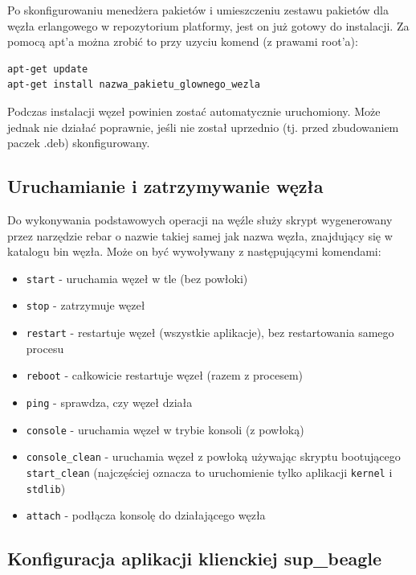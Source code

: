 \documentclass[polish,12pt]{aghthesis}
\begin{document}
Po skonfigurowaniu menedżera pakietów i umieszczeniu zestawu pakietów dla węzła erlangowego w repozytorium platformy, jest on już gotowy do instalacji. Za pomocą apt'a można zrobić to przy uzyciu komend (z prawami root'a):

\begin{lstlisting}
apt-get update
apt-get install nazwa_pakietu_glownego_wezla
\end{lstlisting}
Podczas instalacji węzeł powinien zostać automatycznie uruchomiony. Może jednak nie działać poprawnie, jeśli nie został uprzednio (tj. przed zbudowaniem paczek .deb) skonfigurowany.

\subsection{Uruchamianie i zatrzymywanie węzła}

Do wykonywania podstawowych operacji na węźle służy skrypt wygenerowany przez narzędzie rebar o nazwie takiej samej jak nazwa węzła, znajdujący się w katalogu bin węzła. Może on być wywoływany z następującymi komendami:
\begin{itemize}
\item \texttt{start} - uruchamia węzeł w tle (bez powłoki)
\item \texttt{stop} - zatrzymuje węzeł
\item \texttt{restart} - restartuje węzeł (wszystkie aplikacje), bez restartowania samego procesu
\item \texttt{reboot} - całkowicie restartuje węzeł (razem z procesem)
\item \texttt{ping} - sprawdza, czy węzeł działa
\item \texttt{console} - uruchamia węzeł w trybie konsoli (z powłoką)
\item \texttt{console\_clean} - uruchamia węzeł z powłoką używając skryptu bootującego \texttt{start\_clean} (najczęściej oznacza to uruchomienie tylko aplikacji \texttt{kernel} i \texttt{stdlib})
\item \texttt{attach} - podłącza konsolę do działającego węzła
\end{itemize}
\subsection{Konfiguracja aplikacji klienckiej sup\_beagle}
\end{document}
